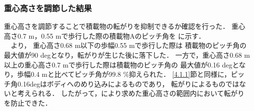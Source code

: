 \subsubsection{重心高さを調節した結果}
\label {4.1.2}
重心高さを調節することで積載物の転がりを抑制できるか確認を行った．
重心高さ0.7 m，0.55 mで歩行した際の積載物Aのピッチ角を
に示す．\\
　より，
重心高さ0.68 m以下の歩幅0.55 mで歩行した際は
積載物のピッチ角の最大値が90 degとなり，転がりが生じた後に落下した．
一方で，重心高さ0.68 m以上の重心高さ0.7 mで歩行した際は積載物のピッチ角の
最大値が0.16 degとなり，歩幅0.4 mと比べてピッチ角が99.8 \%抑えられた．
\ref{4.1.1}節と同様に，ピッチ角0.16degはボディへのめり込みによるものであり，
転がりによるものではないと考えられる．
したがって，により求めた重心高さの範囲内において転がりを防止できた．\\
\begin{table}[t]
    \caption{Parameters of the model}
    \begin{center}
        
    \end{center}
\end{table}

